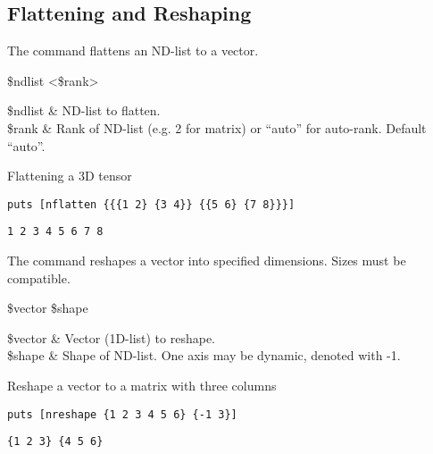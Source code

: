 \subsection{Flattening and Reshaping}
The command  flattens an ND-list to a vector.
\begin{syntax}
 \$ndlist <\$rank>
\end{syntax}
\begin{args}
\$ndlist & ND-list to flatten. \\
\$rank & Rank of ND-list (e.g. 2 for matrix) or ``auto'' for auto-rank. Default ``auto''.
\end{args}
\begin{example}{Flattening a 3D tensor}
\begin{lstlisting}
puts [nflatten {{{1 2} {3 4}} {{5 6} {7 8}}}]
\end{lstlisting}
\tcblower
\begin{lstlisting}
1 2 3 4 5 6 7 8
\end{lstlisting}
\end{example}

The command  reshapes a vector into specified dimensions.
Sizes must be compatible.
\begin{syntax}
 \$vector \$shape
\end{syntax}
\begin{args}
\$vector & Vector (1D-list) to reshape. \\
\$shape & Shape of ND-list. One axis may be dynamic, denoted with -1.
\end{args}
\begin{example}{Reshape a vector to a matrix with three columns}
\begin{lstlisting}
puts [nreshape {1 2 3 4 5 6} {-1 3}]
\end{lstlisting}
\tcblower
\begin{lstlisting}
{1 2 3} {4 5 6}
\end{lstlisting}
\end{example}


\clearpage

